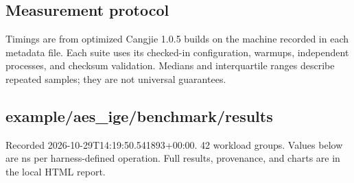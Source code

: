 \subsection{Measurement protocol}
Timings are from optimized Cangjie 1.0.5 builds on the machine recorded in each metadata file. Each suite uses its checked-in configuration, warmups, independent processes, and checksum validation. Medians and interquartile ranges describe repeated samples; they are not universal guarantees.\par
\subsection{example/aes\_ige/benchmark/results}
Recorded 2026-10-29T14:19:50.541893+00:00. 42 workload groups. Values below are ns per harness-defined operation. Full results, provenance, and charts are in the local HTML report.
